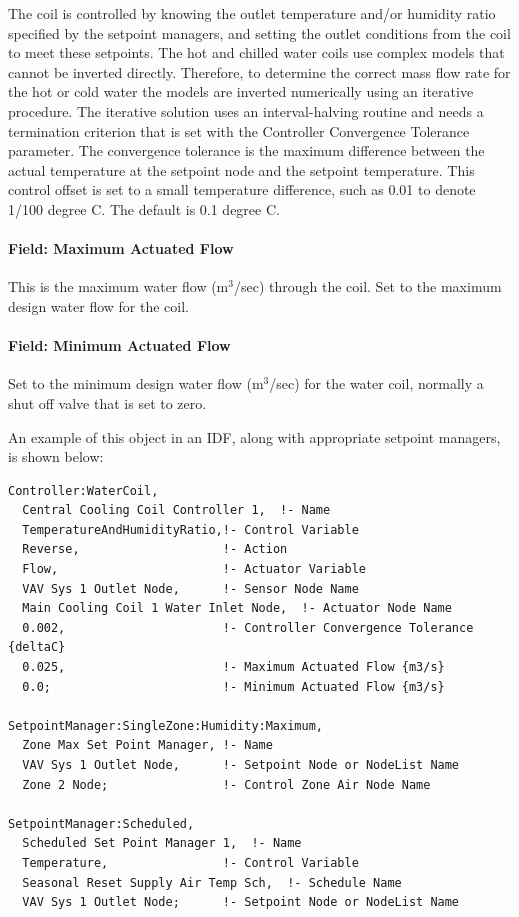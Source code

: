 The coil is controlled by knowing the outlet temperature and/or humidity ratio specified by the setpoint managers, and setting the outlet conditions from the coil to meet these setpoints. The hot and chilled water coils use complex models that cannot be inverted directly. Therefore, to determine the correct mass flow rate for the hot or cold water the models are inverted numerically using an iterative procedure. The iterative solution uses an interval-halving routine and needs a termination criterion that is set with the Controller Convergence Tolerance parameter. The convergence tolerance is the maximum difference between the actual temperature at the setpoint node and the setpoint temperature. This control offset is set to a small temperature difference, such as 0.01 to denote 1/100 degree C. The default is 0.1 degree C.

\paragraph{Field: Maximum Actuated Flow}\label{field-maximum-actuated-flow}

This is the maximum water flow (m\(^{3}\)/sec) through the coil. Set to the maximum design water flow for the coil.

\paragraph{Field: Minimum Actuated Flow}\label{field-minimum-actuated-flow}

Set to the minimum design water flow (m\(^{3}\)/sec) for the water coil, normally a shut off valve that is set to zero.

An example of this object in an IDF, along with appropriate setpoint managers, is shown below:

\begin{lstlisting}
Controller:WaterCoil,
  Central Cooling Coil Controller 1,  !- Name
  TemperatureAndHumidityRatio,!- Control Variable
  Reverse,                    !- Action
  Flow,                       !- Actuator Variable
  VAV Sys 1 Outlet Node,      !- Sensor Node Name
  Main Cooling Coil 1 Water Inlet Node,  !- Actuator Node Name
  0.002,                      !- Controller Convergence Tolerance {deltaC}
  0.025,                      !- Maximum Actuated Flow {m3/s}
  0.0;                        !- Minimum Actuated Flow {m3/s}

SetpointManager:SingleZone:Humidity:Maximum,
  Zone Max Set Point Manager, !- Name
  VAV Sys 1 Outlet Node,      !- Setpoint Node or NodeList Name
  Zone 2 Node;                !- Control Zone Air Node Name

SetpointManager:Scheduled,
  Scheduled Set Point Manager 1,  !- Name
  Temperature,                !- Control Variable
  Seasonal Reset Supply Air Temp Sch,  !- Schedule Name
  VAV Sys 1 Outlet Node;      !- Setpoint Node or NodeList Name
\end{lstlisting}

